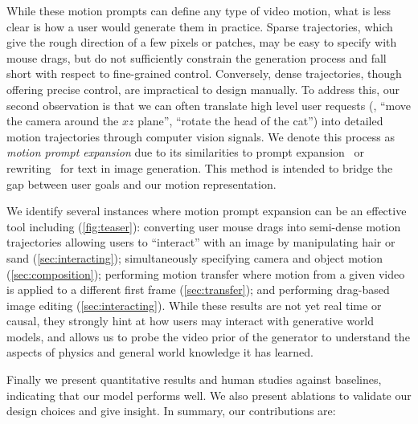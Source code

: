 While these motion prompts can define any type of video motion, what is less clear is how a user would generate them in practice. 
Sparse trajectories, which give the rough direction of a few pixels or patches, may be easy to specify with mouse drags, but do not sufficiently constrain the generation process and fall short with respect to fine-grained control. Conversely, dense trajectories, though offering precise control, are impractical to design manually. 
To address this, our second observation is that we can often translate high level user requests (\eg, ``move the camera around the $xz$ plane'', ``rotate the head of the cat'') into detailed motion trajectories through computer vision signals. We denote this process as \emph{motion prompt expansion} due to its similarities to prompt expansion~\cite{datta2023prompt} or rewriting~\cite{betker2023improving} for text in image generation. This method is intended to bridge the gap between user goals and our  motion representation. 





We identify several instances where motion prompt expansion can be an effective tool including (\cref{fig:teaser}): converting user mouse drags into semi-dense motion trajectories allowing users to ``interact'' with an image by manipulating hair or sand (\cref{sec:interacting});  simultaneously specifying camera and object motion (\cref{sec:composition}); performing motion transfer where motion from a given video is applied to a different first frame (\cref{sec:transfer}); and performing drag-based image editing (\cref{sec:interacting}). While these results are not yet real time or causal, they strongly hint at how users may interact with generative world models, and allows us to probe the video prior of the generator to understand the aspects of physics and general world knowledge it has learned.



Finally we present quantitative results and human studies against baselines, indicating that our model performs well. We also present ablations to validate our design choices and give insight. In summary, our contributions are:

